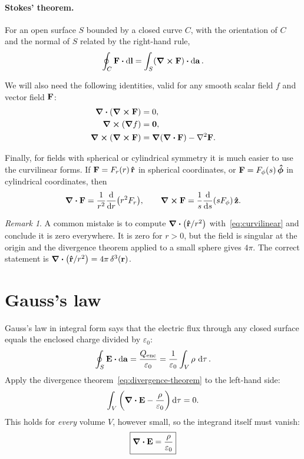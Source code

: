 \documentclass[11pt,a4paper]{article}
\theoremstyle{definition}
\theoremstyle{remark}
\newtheorem*{remark}{Remark}
\newcommand{\E}{\vb{E}}
\newcommand{\eps}{\varepsilon_0}
\begin{document}
\paragraph{Stokes' theorem.} For an open surface $S$ bounded by a closed curve $C$, with the orientation of $C$ and the normal of $S$ related by the right-hand rule,
\begin{equation}\label{eq:stokes-theorem}
  \oint_C \vb{F}\vdot\dd{\vb{l}} = \int_S (\curl{\vb{F}})\vdot\dd{\vb{a}}.
\end{equation}

We will also need the following identities, valid for any smooth scalar field $f$ and vector field $\vb{F}$:
\begin{align}
  \div(\curl{\vb{F}}) &= 0, \label{eq:div-curl}\\
  \curl(\grad{f}) &= \vb{0}, \label{eq:curl-grad}\\
  \curl(\curl{\vb{F}}) &= \grad(\div{\vb{F}}) - \laplacian{\vb{F}}. \label{eq:curl-curl}
\end{align}

Finally, for fields with spherical or cylindrical symmetry it is much easier to use the curvilinear forms. If $\vb{F} = F_r(r)\,\vu{r}$ in spherical coordinates, or $\vb{F} = F_\phi(s)\,\vu*{\phi}$ in cylindrical coordinates, then
\begin{equation}\label{eq:curvilinear}
  \div{\vb{F}} = \frac{1}{r^2}\dv{r}\qty(r^2 F_r),
  \qquad
  \curl{\vb{F}} = \frac{1}{s}\dv{s}\qty(s F_\phi)\,\vu{z}.
\end{equation}

\begin{remark}
A common mistake is to compute $\div(\vu{r}/r^2)$ with~\eqref{eq:curvilinear} and conclude it is zero everywhere. It is zero for $r > 0$, but the field is singular at the origin and the divergence theorem applied to a small sphere gives $4\pi$. The correct statement is $\div(\vu{r}/r^2) = 4\pi\,\delta^3(\vb{r})$.
\end{remark}

\section{Gauss's law}
\label{sec:gauss}

Gauss's law in integral form says that the electric flux through any closed surface equals the enclosed charge divided by $\eps$:
\begin{equation}\label{eq:gauss-integral}
  \oint_S \E\vdot\dd{\vb{a}} = \frac{Q_\text{enc}}{\eps} = \frac{1}{\eps}\int_V \rho\,\dd{\tau}.
\end{equation}
Apply the divergence theorem~\eqref{eq:divergence-theorem} to the left-hand side:
\[
  \int_V \qty(\div{\E} - \frac{\rho}{\eps})\dd{\tau} = 0.
\]
This holds for \emph{every} volume $V$, however small, so the integrand itself must vanish:
\begin{equation}\label{eq:gauss-diff}
  \boxed{\div{\E} = \frac{\rho}{\eps}}
\end{equation}
\end{document}
